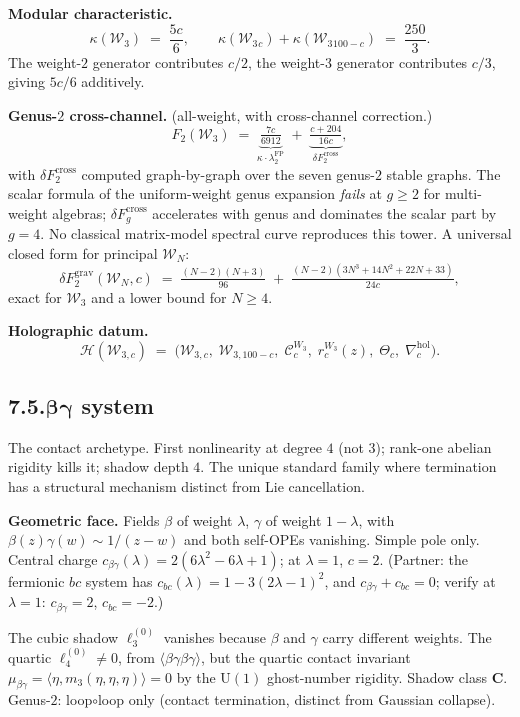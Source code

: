 \documentclass[11pt]{report}
\theoremstyle{definition}
\theoremstyle{remark}
\providecommand{\cC}{\mathcal{C}}
\providecommand{\cH}{\mathcal{H}}
\providecommand{\cW}{\mathcal{W}}
\providecommand{\cross}{\mathrm{cross}}
\providecommand{\grav}{\mathrm{grav}}
\providecommand{\hol}{\mathrm{hol}}
\providecommand{\FP}{\mathrm{FP}}
\numberwithin{equation}{section}
\begin{document}
\medskip\noindent\textbf{Modular characteristic.}
\[
\kappa(\cW_3) \;=\; \frac{5c}{6},
\qquad
\kappa(\cW_3{}_c) + \kappa(\cW_3{}_{100-c})
\;=\; \frac{250}{3}.
\]
The weight-$2$ generator contributes $c/2$, the weight-$3$
generator contributes $c/3$, giving $5c/6$ additively.

\medskip\noindent\textbf{Genus-$2$ cross-channel.} (all-weight,
with cross-channel correction.)
\begin{equation}\label{eq:w3-genus2-b}
F_2(\cW_3)
\;=\;
\underbrace{\tfrac{7c}{6912}}_{\kappa\cdot\lambda_2^{\FP}}
\;+\;
\underbrace{\tfrac{c+204}{16c}}_{\delta F_2^{\cross}},
\end{equation}
with $\delta F_2^{\cross}$ computed graph-by-graph over the
seven genus-$2$ stable graphs. The scalar formula of the
uniform-weight genus expansion \emph{fails} at $g \ge 2$
for multi-weight algebras; $\delta F_g^{\cross}$ accelerates
with genus and dominates the scalar part by $g = 4$. No
classical matrix-model spectral curve reproduces this tower.
A universal closed form for principal $\cW_N$:
\[
\delta F_2^{\grav}(\cW_N, c)
\;=\;
\tfrac{(N-2)(N+3)}{96}
\;+\;
\tfrac{(N-2)(3N^3 + 14N^2 + 22N + 33)}{24c},
\]
exact for $\cW_3$ and a lower bound for $N \ge 4$.

\medskip\noindent\textbf{Holographic datum.}
\[
\cH(\cW_{3,c})
\;=\;
\bigl(
\cW_{3,c},\;
\cW_{3,100-c},\;
\cC_c^{W_3},\;
r_c^{W_3}(z),\;
\Theta_c,\;
\nabla^{\hol}_c
\bigr).
\]

\subsection*{7.5.\quad $\boldsymbol{\beta\gamma}$ system}

The contact archetype. First nonlinearity at degree $4$ (not $3$);
rank-one abelian rigidity kills it; shadow depth $4$. The unique
standard family where termination has a structural mechanism
distinct from Lie cancellation.

\medskip\noindent\textbf{Geometric face.} Fields $\beta$ of
weight $\lambda$, $\gamma$ of weight $1-\lambda$, with
$\beta(z)\gamma(w) \sim 1/(z-w)$ and both self-OPEs vanishing.
Simple pole only. Central charge
$c_{\beta\gamma}(\lambda) = 2(6\lambda^2 - 6\lambda + 1)$; at
$\lambda = 1$, $c = 2$. (Partner: the fermionic $bc$ system has
$c_{bc}(\lambda) = 1 - 3(2\lambda - 1)^2$, and
$c_{\beta\gamma} + c_{bc} = 0$; verify at $\lambda = 1$:
$c_{\beta\gamma} = 2$, $c_{bc} = -2$.)

The cubic shadow $\ell_3^{(0)}$ vanishes because $\beta$ and
$\gamma$ carry different weights. The quartic
$\ell_4^{(0)} \neq 0$, from $\langle\beta\gamma\beta\gamma\rangle$,
but the quartic contact invariant
$\mu_{\beta\gamma} = \langle\eta, m_3(\eta,\eta,\eta)\rangle = 0$
by the $\mathrm{U}(1)$ ghost-number rigidity. Shadow class
$\mathbf C$. Genus-$2$: loop$\circ$loop only (contact
termination, distinct from Gaussian collapse).
\end{document}
